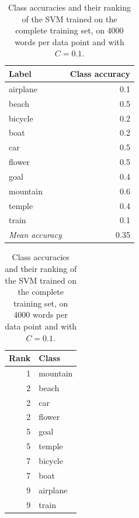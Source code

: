 \documentclass[a4paper,10pt]{article}
\begin{document}
\begin{table}
  \begin{subtable}{.48\textwidth}
    \centering
    \begin{tabular}{l|r}
      Label & Class accuracy \\
      \hline
      airplane & 0.1 \\
      beach & 0.5 \\
      bicycle & 0.2 \\
      boat & 0.2 \\
      car & 0.5 \\
      flower & 0.5 \\
      goal & 0.4 \\
      mountain & 0.6 \\
      temple & 0.4 \\
      train & 0.1 \\
      \hline
      \emph{Mean accuracy} & 0.35 \\
    \end{tabular}
    \caption{Class accuracies.}
    \label{t:svmclassacc}
  \end{subtable}
  \hspace*{\fill}
  \begin{subtable}{.48\textwidth}
    \centering
    \begin{tabular}{rl}
      Rank & Class \\
      \hline
      1 & mountain \\
      2 & beach \\
      2 & car \\
      2 & flower \\
      5 & goal \\
      5 & temple \\
      7 & bicycle \\
      7 & boat \\
      9 & airplane \\
      9 & train \\
    \end{tabular}
    \caption{Class ranking.}
    \label{t:svmclassrank}
  \end{subtable}
  \caption{Class accuracies and their ranking of the SVM trained on the complete training set, on 4000 words per data point and with $C = 0.1$.}
\end{table}
\end{document}
